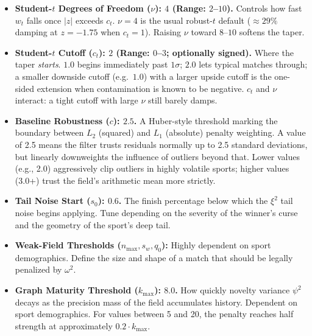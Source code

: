 \documentclass[12pt]{article}
\newcommand{\nudof}{\nu}       %
\newcommand{\ctcut}{c_t}       %
\begin{document}
\begin{itemize}
		\item \textbf{Student-$t$ Degrees of Freedom ($\nudof$): $4$ (Range: $2$--$10$).}
		Controls how fast \(w_t\) falls once \(|z|\) exceeds \(\ctcut\). \(\nudof = 4\) is the usual robust-$t$ default (\(\approx 29\%\) damping at \(z = -1.75\) when \(\ctcut = 1\)). Raising \(\nudof\) toward \(8\)--$10$ softens the taper.
		\item \textbf{Student-$t$ Cutoff ($\ctcut$): $2$ (Range: $0$--$3$; optionally signed).}
		Where the taper \emph{starts}. \(1.0\) begins immediately past \(1\sigma\); \(2.0\) lets typical matches through; a smaller downside cutoff (e.g.\ \(1.0\)) with a larger upside cutoff is the one-sided extension when contamination is known to be negative. \(\ctcut\) and \(\nudof\) interact: a tight cutoff with large \(\nudof\) still barely damps.
		\item \textbf{Baseline Robustness ($c$): $2.5$.}
		A Huber-style threshold marking the boundary between $L_2$ (squared) and $L_1$ (absolute) penalty weighting. A value of 2.5 means the filter trusts residuals normally up to 2.5 standard deviations, but linearly downweights the influence of outliers beyond that. Lower values (e.g., 2.0) aggressively clip outliers in highly volatile sports; higher values (3.0+) trust the field's arithmetic mean more strictly.
		\item \textbf{Tail Noise Start ($s_0$): $0.6$.}
		The finish percentage below which the $\xi^2$ tail noise begins applying. Tune depending on the severity of the winner's curse and the geometry of the sport's deep tail.
		\item \textbf{Weak-Field Thresholds ($n_{\mathrm{max}}, s_w, q_0$):}
		Highly dependent on sport demographics. Define the size and shape of a match that should be legally penalized by $\omega^2$.
		\item \textbf{Graph Maturity Threshold ($k_\mathrm{max}$): $8.0$.}
		How quickly novelty variance $\psi^2$ decays as the precision mass of the field accumulates history. Dependent on sport demographics. For values between 5 and 20, the penalty reaches half strength at approximately $0.2 \cdot k_\mathrm{max}$.
	\end{itemize}

	
	
\end{document}
